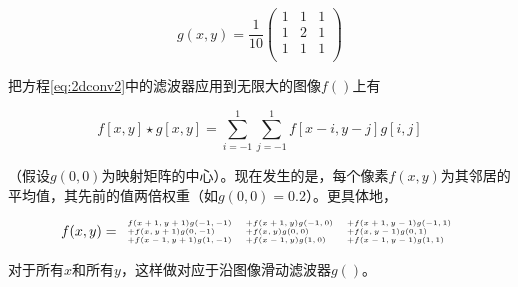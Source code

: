 \begin{equation}
g(x,y)=\frac{1}{10}
\left(
\begin{array}{ccc}
1 & 1 & 1\\
1 & 2 & 1\\
1 & 1 & 1\\
\end{array}
\right)
\end{equation}


把方程\ref{eq:2dconv2}中的滤波器应用到无限大的图像$f()$上有

\begin{equation}\label{eq:2dconv3}
f[x,y]\star g[x,y]=\sum_{i=-1}^{1}\sum_{j=-1}^{1}f[x-i,y-j]g[i,j]
\end{equation}

（假设$g(0,0)$为映射矩阵的中心）。现在发生的是，每个像素$f(x,y)$为其邻居的平均值，其先前的值两倍权重（如$g(0,0)= 0.2$）。更具体地，

\begin{equation}
\tiny
f(x,y)=
\begin{array}{lll}
f(x+1,y+1)g(-1,-1) &+f(x+1,y)g(-1,0) &+f(x+1,y-1)g(-1,1)\\
+f(x,y+1)g(0,-1) &+f(x,y)g(0,0) &+f(x,y-1)g(0,1)\\
+f(x-1,y+1)g(1,-1) &+f(x-1,y)g(1,0) &+f(x-1,y-1)g(1,1)
\end{array}
\end{equation}


对于所有$x$和所有$y$，这样做对应于沿图像滑动滤波器$g()$。

